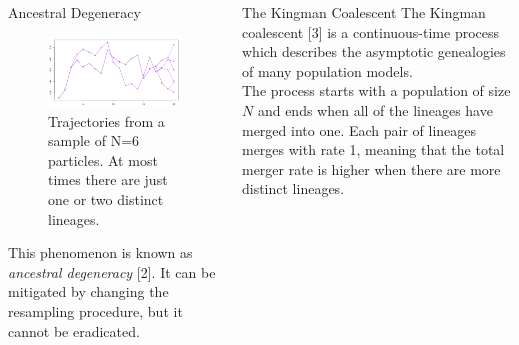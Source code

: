 \documentclass[final, 12pt]{beamer}
\newlength{\colwidth}
\begin{document}
\begin{frame}
\begin{columns}
\begin{column}{\colwidth}
\begin{block}{Ancestral Degeneracy}
\begin{figure} %
\includegraphics[width=0.9\colwidth]{degeneracy.pdf}
\caption{Trajectories from a sample of N=6 particles. At most times there are just one or two distinct lineages.}
\end{figure}

This phenomenon is known as \emph{ancestral degeneracy} [2]. It can be mitigated by changing the resampling procedure, but it cannot be eradicated.
\end{block}
\end{column}

\begin{column}{\colwidth}

\vspace*{-75pt}

\begin{block}{The Kingman Coalescent}
The Kingman coalescent [3] is a continuous-time process which describes the asymptotic genealogies of many population models.\\[10pt]

The process starts with a population of size $N$ and ends when all of the lineages have merged into one.
Each pair of lineages merges with rate 1, meaning that the total merger rate is higher when there are more distinct lineages.\\[10pt]


\end{block}
\end{column}
\end{columns}
\end{frame}
\end{document}
